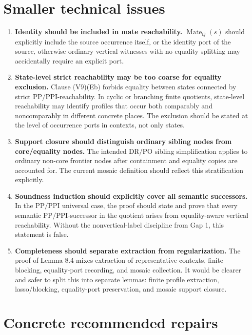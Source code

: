 \documentclass[11pt]{article}
\newcommand{\DR}{\mathrm{DR}}
\newcommand{\PO}{\mathrm{PO}}
\newcommand{\PP}{\mathrm{PP}}
\newcommand{\PPI}{\mathrm{PPI}}
\newcommand{\Mate}{\operatorname{Mate}}
\begin{document}
\section{Smaller technical issues}

\begin{enumerate}[label=(S\arabic*),leftmargin=*]
\item \textbf{Identity should be included in mate reachability.}  \(\Mate_Q(s)\) should explicitly include the source occurrence itself, or the identity port of the source, otherwise ordinary vertical witnesses with no equality splitting may accidentally require an explicit port.

\item \textbf{State-level strict reachability may be too coarse for equality exclusion.} Clause (V9)(Eb) forbids equality between states connected by strict \(\PP/\PPI\)-reachability.  In cyclic or branching finite quotients, state-level reachability may identify profiles that occur both comparably and noncomparably in different concrete places.  The exclusion should be stated at the level of occurrence ports in contexts, not only states.

\item \textbf{Support closure should distinguish ordinary sibling nodes from core/equality nodes.}  The intended \(\DR/\PO\) sibling simplification applies to ordinary non-core frontier nodes after containment and equality copies are accounted for.  The current mosaic definition should reflect this stratification explicitly.

\item \textbf{Soundness induction should explicitly cover all semantic successors.}  In the \(\PP/\PPI\) universal case, the proof should state and prove that every semantic \(\PP/\PPI\)-successor in the quotient arises from equality-aware vertical reachability.  Without the nonvertical-label discipline from Gap 1, this statement is false.

\item \textbf{Completeness should separate extraction from regularization.}  The proof of Lemma 8.4 mixes extraction of representative contexts, finite blocking, equality-port recording, and mosaic collection.  It would be clearer and safer to split this into separate lemmas: finite profile extraction, lasso/blocking, equality-port preservation, and mosaic support closure.
\end{enumerate}

\section{Concrete recommended repairs}
\end{document}

